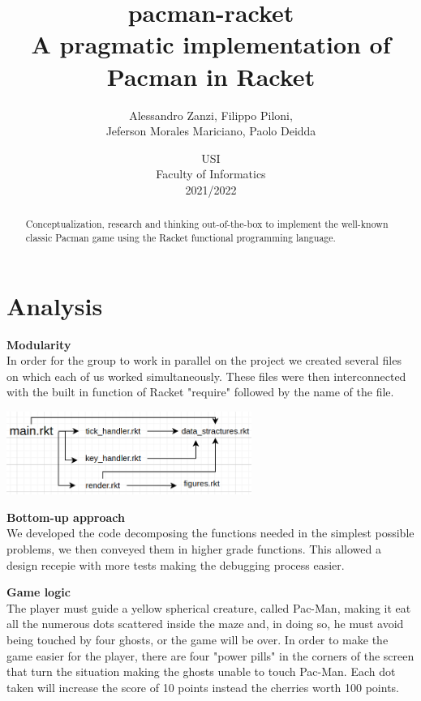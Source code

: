 \documentclass{article}
\title{
\textbf{pacman-racket} \\
A pragmatic implementation of Pacman in Racket
}
\author{
    Alessandro Zanzi,
    Filippo Piloni,\\
    Jeferson Morales Mariciano,
    Paolo Deidda
}
\date{
USI \\
Faculty of Informatics \\
[\baselineskip]  2021/2022
}
\begin{document}
\begin{titlepage}
\maketitle  

\end{titlepage}
 \begin{abstract}
Conceptualization, research and thinking out-of-the-box
to implement the well-known classic Pacman game
using the Racket functional programming language.
 \end{abstract}
\clearpage
 \tableofcontents
 \clearpage
 \section{Analysis}
 
 \hspace{0.5cm}\textbf{Modularity}\\
 In order for the group to work in parallel on the project we created several files on which each of us worked simultaneously. These files were then interconnected with the built in function of Racket "require" followed by the name of the file.
 
 \begin{center}
 \includegraphics[width=8cm]{images/dependency_three.png}
 \end{center}
 
 \textbf{Bottom-up approach}\\
 We developed the code decomposing the functions needed in the simplest possible problems, we then conveyed them in higher grade functions. This allowed a design recepie with more tests making the debugging process easier.
 
 \textbf{Game logic}\\
The player must guide a yellow spherical creature, called Pac-Man, making it eat all the numerous dots scattered inside the maze and, in doing so, he must avoid being touched by four ghosts, or the game will be over. In order to make the game easier for the player, there are four "power pills" in the corners of the screen that turn the situation making the ghosts unable to touch Pac-Man. Each dot taken will increase the score of 10 points instead the cherries worth 100 points.
\end{document}
